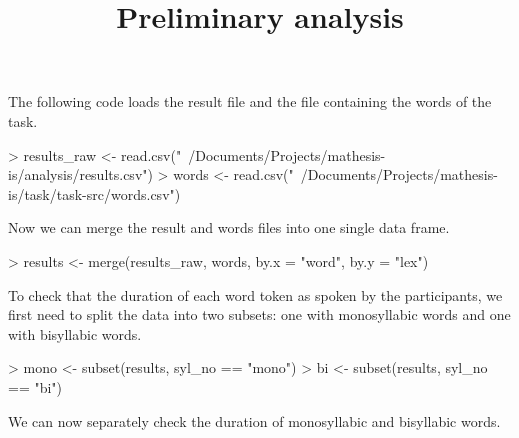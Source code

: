 \documentclass[a4paper,11pt]{article}
\title{Preliminary analysis}
\begin{document}

\maketitle


The following code loads the result file and the file containing the words of the task.

\begin{Schunk}
\begin{Sinput}
> results_raw <- read.csv("~/Documents/Projects/mathesis-is/analysis/results.csv")
> words <- read.csv("~/Documents/Projects/mathesis-is/task/task-src/words.csv")
\end{Sinput}
\end{Schunk}

Now we can merge the result and words files into one single data frame.

\begin{Schunk}
\begin{Sinput}
> results <- merge(results_raw, words, by.x = "word", by.y = "lex")
\end{Sinput}
\end{Schunk}

To check that the duration of each word token as spoken by the participants, we first need to split the data into two subsets: one with monosyllabic words and one with bisyllabic words.

\begin{Schunk}
\begin{Sinput}
> mono <- subset(results, syl_no == "mono")
> bi <- subset(results, syl_no == "bi")
\end{Sinput}
\end{Schunk}

We can now separately check the duration of monosyllabic and bisyllabic words.
\end{document}
